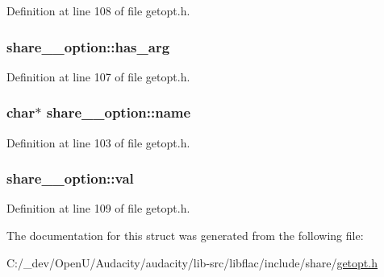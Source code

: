 Definition at line 108 of file getopt.\+h.

\subsubsection[{\texorpdfstring{has\+\_\+arg}{has_arg}}]{ share\+\_\+\+\_\+option\+::has\+\_\+arg}\hypertarget{structshare____option_a8f5933942ecba67c80ed113c7ba12725}{}\label{structshare____option_a8f5933942ecba67c80ed113c7ba12725}


Definition at line 107 of file getopt.\+h.

\subsubsection[{\texorpdfstring{name}{name}}]{\setlength{\rightskip}{0pt plus 5cm}char$\ast$ share\+\_\+\+\_\+option\+::name}\hypertarget{structshare____option_aa2ac1f332cd44329a9cec91813ba70bd}{}\label{structshare____option_aa2ac1f332cd44329a9cec91813ba70bd}


Definition at line 103 of file getopt.\+h.

\subsubsection[{\texorpdfstring{val}{val}}]{ share\+\_\+\+\_\+option\+::val}\hypertarget{structshare____option_af06fa702ffc81a9bf193cea62277e25a}{}\label{structshare____option_af06fa702ffc81a9bf193cea62277e25a}


Definition at line 109 of file getopt.\+h.



The documentation for this struct was generated from the following file\+:\begin{DoxyCompactItemize}
\item 
C\+:/\+\_\+dev/\+Open\+U/\+Audacity/audacity/lib-\/src/libflac/include/share/\hyperlink{getopt_8h}{getopt.\+h}\end{DoxyCompactItemize}
